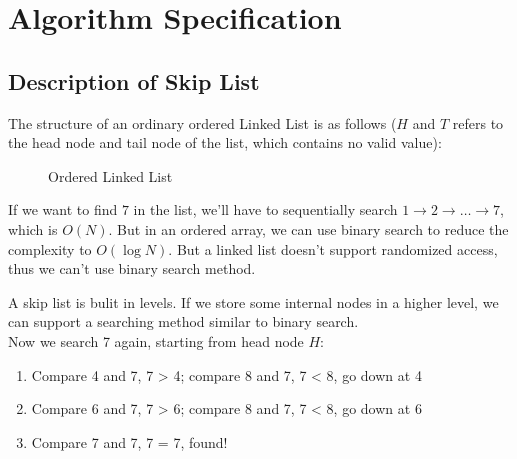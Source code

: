 \section{Algorithm Specification}
\subsection{Description of Skip List}
The structure of an ordinary ordered Linked List is as follows ($H$ and $T$ refers to the head node and tail node of the list, which contains no valid value):
\begin{figure}[H]
    \centering
    \caption{Ordered Linked List}\label{fig:lkl}
\end{figure}
If we want to find $7$ in the list, we'll have to sequentially search $1\to 2\to \ldots\to 7$, which is $O(N)$. But in an ordered array, we can use binary search to reduce the complexity to $O(\log{N})$. But a linked list doesn't support randomized access, thus we can't use binary search method.\par
A skip list is bulit in levels. If we store some internal nodes in a higher level, we can support a searching method similar to binary search.\\
Now we search 7 again, starting from head node $H$:
\begin{enumerate}
    \item Compare 4 and 7, 7 > 4; compare 8 and 7, 7 < 8, go down at 4
    \item Compare 6 and 7, 7 > 6; compare 8 and 7, 7 < 8, go down at 6
    \item Compare 7 and 7, 7 = 7, found!
\end{enumerate}
